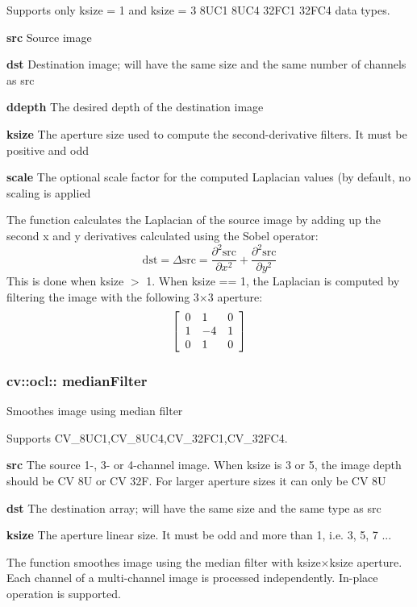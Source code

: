 \documentclass{article}
\begin{document}
Supports only ksize = 1 and ksize = 3 8UC1 8UC4 32FC1 32FC4 data types.

\textbf{src }Source image

\textbf{dst }Destination image; will have the same size and the same number
of channels as src

\textbf{ddepth }The desired depth of the destination image

\textbf{ksize }The aperture size used to compute the second-derivative
filters. It must be positive and odd

\textbf{scale }The optional scale factor for the computed Laplacian values
(by default, no scaling is applied

The function calculates the Laplacian of the source image by adding up the
second x and y derivatives calculated using the Sobel operator:
\[
\mbox{dst}=\Delta \mbox{src}=\frac{\partial ^2\mbox{src}}{\partial
x^2}+\frac{\partial ^2\mbox{src}}{\partial y^2}
\]
This is done when ksize $>$ 1. When ksize == 1, the Laplacian is computed by
filtering the image with the following 3$\times $3 aperture:
\[
\left[ {{\begin{array}{*{20}c}
 0 \hfill & 1 \hfill & 0 \hfill \\
 1 \hfill & {-4} \hfill & 1 \hfill \\
 0 \hfill & 1 \hfill & 0 \hfill \\
\end{array} }} \right]
\]
\newpage

\subsubsection{cv::ocl:: medianFilter}
\label{subsubsec:mylabel40}
Smoothes image using median filter

Supports CV{\_}8UC1,CV{\_}8UC4,CV{\_}32FC1,CV{\_}32FC4.

\textbf{src }The source 1-, 3- or 4-channel image. When ksize is 3 or 5, the
image depth should be CV 8U or CV 32F. For larger aperture sizes it
can only be CV 8U

\textbf{dst }The destination array; will have the same size and the same
type as src

\textbf{ksize }The aperture linear size. It must be odd and more than 1,
i.e. 3, 5, 7 ...

The function smoothes image using the median filter with ksize$\times $ksize
aperture. Each channel of a multi-channel image is processed independently.
In-place operation is supported.
\end{document}
